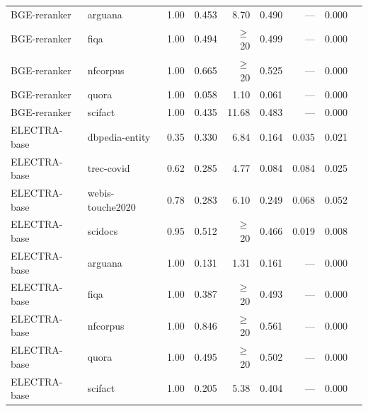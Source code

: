 \begin{table}[h!]
\begin{tabular}{llrrrrrrr}
\rowcolor{singleclasspink}
BGE-reranker   & arguana              & 1.00 & 0.453 & 8.70 & 0.490 & --- & 0.000 \\
\rowcolor{singleclasspink}
BGE-reranker   & fiqa                 & 1.00 & 0.494 & $\geq$20 & 0.499 & --- & 0.000 \\
\rowcolor{singleclasspink}
BGE-reranker   & nfcorpus             & 1.00 & 0.665 & $\geq$20 & 0.525 & --- & 0.000 \\
\rowcolor{singleclasspink}
BGE-reranker   & quora                & 1.00 & 0.058 & 1.10 & 0.061 & --- & 0.000 \\
\rowcolor{singleclasspink}
BGE-reranker   & scifact              & 1.00 & 0.435 & 11.68 & 0.483 & --- & 0.000 \\
\midrule
\rowcolor{cleangreen}
ELECTRA-base   & dbpedia-entity       & 0.35 & 0.330 & 6.84 & 0.164 & 0.035 & 0.021 \\
\rowcolor{cleangreen}
ELECTRA-base   & trec-covid           & 0.62 & 0.285 & 4.77 & 0.084 & 0.084 & 0.025 \\
\rowcolor{cleangreen}
ELECTRA-base   & webis-touche2020     & 0.78 & 0.283 & 6.10 & 0.249 & 0.068 & 0.052 \\
\rowcolor{cleangreen}
ELECTRA-base   & scidocs              & 0.95 & 0.512 & $\geq$20 & 0.466 & 0.019 & 0.008 \\
\rowcolor{singleclasspink}
ELECTRA-base   & arguana              & 1.00 & 0.131 & 1.31 & 0.161 & --- & 0.000 \\
\rowcolor{singleclasspink}
ELECTRA-base   & fiqa                 & 1.00 & 0.387 & $\geq$20 & 0.493 & --- & 0.000 \\
\rowcolor{singleclasspink}
ELECTRA-base   & nfcorpus             & 1.00 & 0.846 & $\geq$20 & 0.561 & --- & 0.000 \\
\rowcolor{singleclasspink}
ELECTRA-base   & quora                & 1.00 & 0.495 & $\geq$20 & 0.502 & --- & 0.000 \\
\rowcolor{singleclasspink}
ELECTRA-base   & scifact              & 1.00 & 0.205 & 5.38 & 0.404 & --- & 0.000 \\
\bottomrule
\end{tabular}
\end{table}


